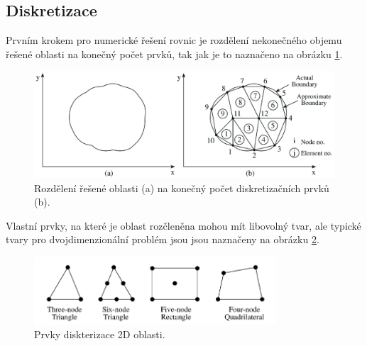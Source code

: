 \subsection*{Diskretizace}
Prvním krokem pro numerické řešení rovnic je rozdělení nekonečného objemu řešené oblasti na konečný počet prvků, tak jak je to naznačeno na obrázku \ref{obr:sim_diskretizace}.
\begin{figure}[!h]
	\centering
	\includegraphics[width=13cm]{sim_diskretizace.png}
	\caption{Rozdělení řešené oblasti (a) na konečný počet diskretizačních prvků (b).\cite{num}}
	\label{obr:sim_diskretizace}
\end{figure}
Vlastní prvky, na které je oblast rozčleněna mohou mít libovolný tvar, ale typické tvary pro dvojdimenzionální problém jsou jsou naznačeny na obrázku \ref{obr:sim_prvky}.
\begin{figure}[!h]
	\centering
	\includegraphics[width=9cm]{sim_prvky.png}
	\caption{Prvky diskterizace 2D oblasti.\cite{num}}
	\label{obr:sim_prvky}
\end{figure}

